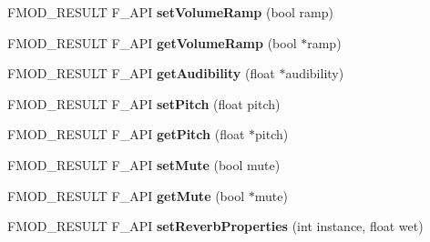 \begin{DoxyCompactItemize}
\item 
\hypertarget{class_f_m_o_d_1_1_channel_control_a9b0d1fdd0f1b7e5a36bc52db635937ce}{F\+M\+O\+D\+\_\+\+R\+E\+S\+U\+L\+T F\+\_\+\+A\+P\+I {\bfseries set\+Volume\+Ramp} (bool ramp)}\label{class_f_m_o_d_1_1_channel_control_a9b0d1fdd0f1b7e5a36bc52db635937ce}

\item 
\hypertarget{class_f_m_o_d_1_1_channel_control_af6d6b32fb42a65f5923663bd641a81a0}{F\+M\+O\+D\+\_\+\+R\+E\+S\+U\+L\+T F\+\_\+\+A\+P\+I {\bfseries get\+Volume\+Ramp} (bool $\ast$ramp)}\label{class_f_m_o_d_1_1_channel_control_af6d6b32fb42a65f5923663bd641a81a0}

\item 
\hypertarget{class_f_m_o_d_1_1_channel_control_aec0c20bdc053d3a7108f85eba1e51a84}{F\+M\+O\+D\+\_\+\+R\+E\+S\+U\+L\+T F\+\_\+\+A\+P\+I {\bfseries get\+Audibility} (float $\ast$audibility)}\label{class_f_m_o_d_1_1_channel_control_aec0c20bdc053d3a7108f85eba1e51a84}

\item 
\hypertarget{class_f_m_o_d_1_1_channel_control_a6bf6574915d654bf493cef613cf6bb62}{F\+M\+O\+D\+\_\+\+R\+E\+S\+U\+L\+T F\+\_\+\+A\+P\+I {\bfseries set\+Pitch} (float pitch)}\label{class_f_m_o_d_1_1_channel_control_a6bf6574915d654bf493cef613cf6bb62}

\item 
\hypertarget{class_f_m_o_d_1_1_channel_control_a68ffb4702e11db6929aa8c3eab8d6131}{F\+M\+O\+D\+\_\+\+R\+E\+S\+U\+L\+T F\+\_\+\+A\+P\+I {\bfseries get\+Pitch} (float $\ast$pitch)}\label{class_f_m_o_d_1_1_channel_control_a68ffb4702e11db6929aa8c3eab8d6131}

\item 
\hypertarget{class_f_m_o_d_1_1_channel_control_abb625c998a818410408aa298b80a393c}{F\+M\+O\+D\+\_\+\+R\+E\+S\+U\+L\+T F\+\_\+\+A\+P\+I {\bfseries set\+Mute} (bool mute)}\label{class_f_m_o_d_1_1_channel_control_abb625c998a818410408aa298b80a393c}

\item 
\hypertarget{class_f_m_o_d_1_1_channel_control_a95c7ac113ca640ed42a6ecfb9f02ac72}{F\+M\+O\+D\+\_\+\+R\+E\+S\+U\+L\+T F\+\_\+\+A\+P\+I {\bfseries get\+Mute} (bool $\ast$mute)}\label{class_f_m_o_d_1_1_channel_control_a95c7ac113ca640ed42a6ecfb9f02ac72}

\item 
\hypertarget{class_f_m_o_d_1_1_channel_control_aa4ac7ea773a9c1c0008859d2fd54e168}{F\+M\+O\+D\+\_\+\+R\+E\+S\+U\+L\+T F\+\_\+\+A\+P\+I {\bfseries set\+Reverb\+Properties} (int instance, float wet)}\label{class_f_m_o_d_1_1_channel_control_aa4ac7ea773a9c1c0008859d2fd54e168}


\end{DoxyCompactItemize}
